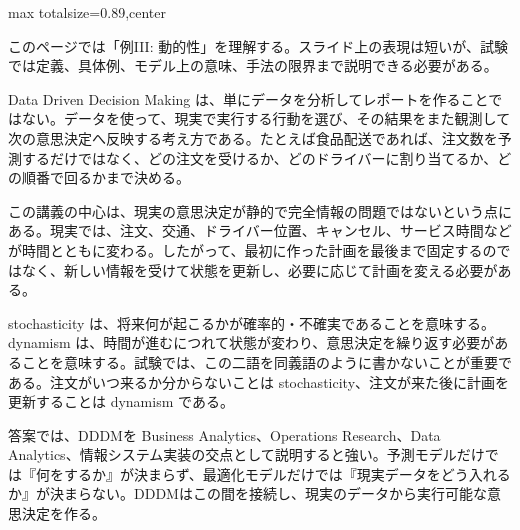 \begin{minipage}[t]{0.58\textwidth}
\begin{adjustbox}{max totalsize={\textwidth}{0.89\textheight},center}
\begin{minipage}{\textwidth}\scriptsize
{}このページでは「例III: 動的性」を理解する。スライド上の表現は短いが、試験では定義、具体例、モデル上の意味、手法の限界まで説明できる必要がある。\par
Data Driven Decision Making は、単にデータを分析してレポートを作ることではない。データを使って、現実で実行する行動を選び、その結果をまた観測して次の意思決定へ反映する考え方である。たとえば食品配送であれば、注文数を予測するだけではなく、どの注文を受けるか、どのドライバーに割り当てるか、どの順番で回るかまで決める。\par
この講義の中心は、現実の意思決定が静的で完全情報の問題ではないという点にある。現実では、注文、交通、ドライバー位置、キャンセル、サービス時間などが時間とともに変わる。したがって、最初に作った計画を最後まで固定するのではなく、新しい情報を受けて状態を更新し、必要に応じて計画を変える必要がある。\par
stochasticity は、将来何が起こるかが確率的・不確実であることを意味する。dynamism は、時間が進むにつれて状態が変わり、意思決定を繰り返す必要があることを意味する。試験では、この二語を同義語のように書かないことが重要である。注文がいつ来るか分からないことは stochasticity、注文が来た後に計画を更新することは dynamism である。\par
答案では、DDDMを Business Analytics、Operations Research、Data Analytics、情報システム実装の交点として説明すると強い。予測モデルだけでは『何をするか』が決まらず、最適化モデルだけでは『現実データをどう入れるか』が決まらない。DDDMはこの間を接続し、現実のデータから実行可能な意思決定を作る。\par

\end{minipage}
\end{adjustbox}
\end{minipage}
